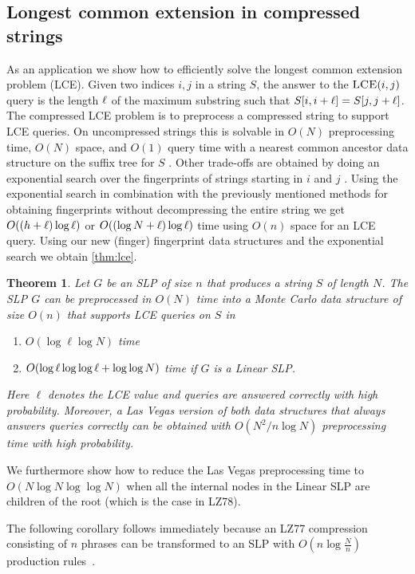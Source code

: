 \documentclass[11pt]{article}
\newtheorem{theorem}{Theorem}
\newcommand{\lceq}{\ensuremath{\textsc{LCE}}}
\newcommand{\lce}{\ensuremath\ell}
\begin{document}
\subsection{Longest common extension in compressed strings}
As an application we show how to efficiently solve the longest common extension problem (LCE).
Given two indices $i, j$ in a string $S$, the answer to the $\lceq(i, j)$ query is the length $\lce$ of the maximum substring such that $S[i, i+\lce] = S[j, j+\lce]$. The compressed LCE problem is to preprocess a compressed string to support LCE queries. On uncompressed strings this is solvable in $O(N)$ preprocessing time, $O(N)$ space, and $O(1)$ query time with a nearest common ancestor data structure on the suffix tree for $S$ \cite{HT1984}. Other trade-offs are obtained by doing an exponential search over the fingerprints of strings starting in $i$ and $j$ \cite{bille12lce}. Using the exponential search in combination with the previously mentioned methods for obtaining fingerprints without decompressing the entire string we get $O((h+\lce)\log \lce)$ or $O((\log N+\lce)\log \lce)$ time using $O(n)$ space for an LCE query. Using our new (finger) fingerprint data structures and the exponential search we obtain \autoref{thm:lce}.

\begin{theorem}\label{thm:lce}
Let $G$ be an SLP of size $n$ that produces a string $S$ of length $N$. The SLP $G$ can be preprocessed in $O(N)$ time into a Monte Carlo data structure of size $O(n)$ that supports LCE queries on $S$ in
\begin{enumerate}
\item[(i)] $O(\log \ell \log N)$ time
\item[(ii)] $O(\log \lce \log\log \lce + \log\log N)$ time if $G$ is a Linear SLP.
\end{enumerate}
Here $\ell$ denotes the LCE value and queries are answered correctly with high probability. Moreover, a Las Vegas version of both data structures that always answers queries correctly can be obtained with
$O(N^2/n \log N)$ preprocessing time with high probability.
\end{theorem}



	


\noindent We furthermore show how to reduce the Las Vegas preprocessing time to $O(N\log N\log\log N)$ when all the internal nodes in the Linear SLP are children of the root (which is the case in LZ78).

The following corollary follows immediately because an LZ77 compression~\cite{lz77} consisting of $n$ phrases can be transformed to an SLP with $O(n\log\frac{N}{n})$ production rules~\cite{charikar2005smallest,rytter2003application}.
\end{document}
